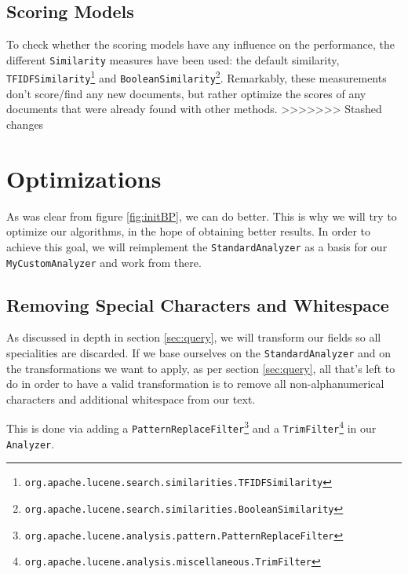 \documentclass[11pt]{article}
\begin{document}
\subsection{Scoring Models}\label{sec:scmodels}
To check whether the scoring models have any influence on the performance, the different \texttt{Similarity} measures have been used: the default similarity, \texttt{TFIDFSimilarity}\footnote{\texttt{org.apache.lucene.search.similarities.TFIDFSimilarity}} and \texttt{BooleanSimilarity}\footnote{\texttt{org.apache.lucene.search.similarities.BooleanSimilarity}}. Remarkably, these measurements don't score/find any new documents, but rather optimize the scores of any documents that were already found with other methods.
>>>>>>> Stashed changes

\section{Optimizations}\label{sec:optimizations}
As was clear from figure \ref{fig:initBP}, we can do better. This is why we will try to optimize our algorithms, in the hope of obtaining better results. In order to achieve this goal, we will reimplement the \texttt{StandardAnalyzer} as a basis for our \texttt{MyCustomAnalyzer} and work from there.

\subsection{Removing Special Characters and Whitespace}
As discussed in depth in section \ref{sec:query}, we will transform our fields so all specialities are discarded. If we base ourselves on the \texttt{StandardAnalyzer} and on the transformations we want to apply, as per section \ref{sec:query}, all that's left to do in order to have a valid transformation is to remove all non-alphanumerical characters and additional whitespace from our text.

This is done via adding a \texttt{PatternReplaceFilter}\footnote{\texttt{org.apache.lucene.analysis.pattern.PatternReplaceFilter}} and a \texttt{TrimFilter}\footnote{\texttt{org.apache.lucene.analysis.miscellaneous.TrimFilter}} in our \texttt{Analyzer}.
\end{document}
